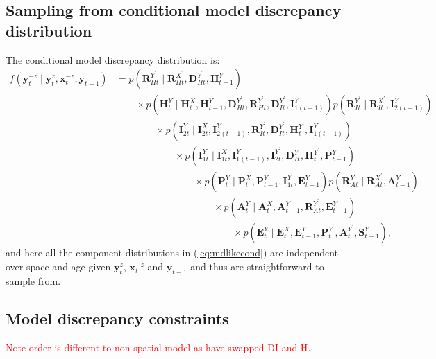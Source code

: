 \documentclass[a4paper]{article}
\newcommand{\bx}{\bm{x}}
\newcommand{\by}{\bm{y}}
\newcommand{\bA}{\bm{A}}
\newcommand{\bD}{\bm{D}}
\newcommand{\bR}{\bm{R}}
\newcommand{\bI}{\bm{I}}
\newcommand{\bP}{\bm{P}}
\newcommand{\bE}{\bm{E}}
\newcommand{\bH}{\bm{H}}
\newcommand{\bS}{\bm{S}}
\begin{document}
\subsection{Sampling from conditional model discrepancy distribution}\label{sec:condmdsim}

The conditional model discrepancy distribution is:
\begin{align}
    f\left(\by^{-z}_t \mid \by^z_t, \bx^{-z}_t, \by_{t - 1}\right) &= p\left(\bR^{Y^\prime}_{Ht} \mid \bR^{X^\prime}_{Ht}, \bD^{Y^\prime}_{Ht}, \bH^{Y}_{t - 1}\right)\nonumber\\
    & \qquad \times p\left(\bH^Y_t \mid \bH^X_t, \bH^{Y}_{t - 1}, \bD^{Y^\prime}_{Ht}, \bR^{Y^\prime}_{Ht}, \bD^{Y^\prime}_{It}, \bI^{Y}_{1(t - 1)}\right) p\left(\bR^{Y^\prime}_{It} \mid \bR^{X^\prime}_{It}, \bI^{Y}_{2(t - 1)}\right)\nonumber\\
    &\qquad \qquad \times p\left(\bI^Y_{2t} \mid \bI^X_{2t}, \bI^{Y}_{2(t - 1)}, \bR^{Y^\prime}_{It}, \bD^{Y^\prime}_{It}, \bH^{Y^\prime}_t, \bI^{Y}_{1(t - 1)}\right)\nonumber\\
    &\qquad \qquad \qquad \times p\left(\bI^Y_{1t} \mid \bI^X_{1t}, \bI^{Y}_{1(t - 1)}, \bI^{Y^\prime}_{2t}, \bD^{Y^\prime}_{It}, \bH^{Y^\prime}_t, \bP^{Y}_{t - 1}\right)\nonumber\\
    &\qquad \qquad \qquad \qquad \times p\left(\bP^Y_t \mid \bP^X_t, \bP^{Y}_{t - 1}, \bI^{Y^\prime}_{1t}, \bE^{Y}_{t - 1}\right)p\left(\bR^{Y^\prime}_{At} \mid \bR^{X^\prime}_{At}, \bA^{Y}_{t - 1}\right)\nonumber\\
    & \qquad \qquad \qquad \qquad \qquad \times p\left(\bA^Y_t \mid \bA^X_t, \bA^{Y}_{t - 1}, \bR^{Y^\prime}_{At}, \bE^{Y}_{t - 1}\right)\nonumber\\
    & \qquad \qquad \qquad \qquad \qquad \qquad \times p\left(\bE^Y_t \mid \bE^X_t, \bE^{Y}_{t - 1}, \bP^{Y^\prime}_t, \bA^{Y^\prime}_t, \bS^{Y}_{t - 1}\right),\label{eq:mdlikecond}
\end{align}
and here all the component distributions in (\ref{eq:mdlikecond}) are independent over space and age given $\by^z_t$, $\bx^{-z}_t$ and $\by_{t - 1}$ and thus are straightforward to sample from.

\subsection{Model discrepancy constraints}\label{sec:MD}

\textcolor{red}{Note order is different to non-spatial model as have swapped DI and H}.
\end{document}
